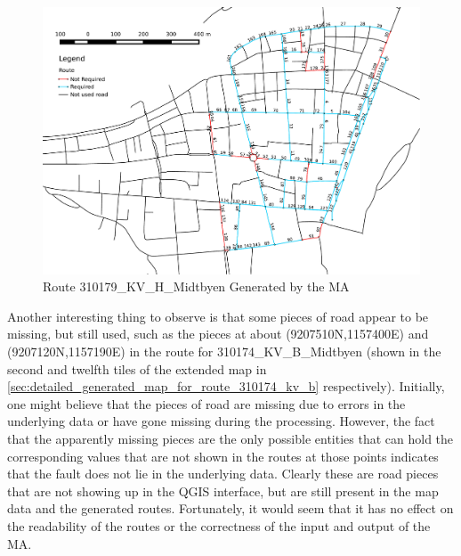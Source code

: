 \begin{landscape}
\begin{figure}[thbp]
    \centerline{\includegraphics[height=0.945\textwidth]{figures/Routes/Drawn/Rute_KV_H_Generert_Proper_Run.pdf}}
    \caption{Route 310179\_KV\_H\_Midtbyen Generated by the MA}
    \label{fig:KV_H_drawn}
\end{figure}
\end{landscape}

Another interesting thing to observe is that some pieces of road appear to be missing, but still used, such as the pieces at about (9207510\degree N,1157400\degree E) and (9207120\degree N,1157190\degree E) in the route for 310174\_KV\_B\_Midtbyen (shown in the second and twelfth tiles of the extended map in \ref{sec:detailed_generated_map_for_route_310174_kv_b} respectively). Initially, one might believe that the pieces of road are missing due to errors in the underlying data or have gone missing during the processing. However, the fact that the apparently missing pieces are the only possible entities that can hold the corresponding values that are not shown in the routes at those points indicates that the fault does not lie in the underlying data. Clearly these are road pieces that are not showing up in the QGIS interface, but are still present in the map data and the generated routes. Fortunately, it would seem that it has no effect on the readability of the routes or the correctness of the input and output of the MA.

